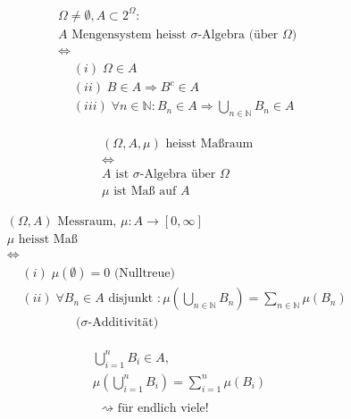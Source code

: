 \documentclass[a4paper]{article}
\begin{document}
{{		{
			\begin{gather*}
				\Omega \neq \emptyset,
				A
				\subset 2 ^{\Omega}: \\
				A \text{ Mengensystem heisst $\sigma$-Algebra (über $\Omega$) } \\
				\Leftrightarrow \\
				\begin{align*}
					&(i) \; \Omega \in A \\
					&(ii) \; B \in A \Rightarrow B ^{c} \in A \\
					&(iii) \; \forall n \in \mathbb{N}: B_n \in A
					\Rightarrow \bigcup_{n \in \mathbb{N}}  B_n \in A
				\end{align*}
			\end{gather*}
		}
		\newpage

		{
			\begin{gather*}
				(\Omega, A, \mu) \text{ heisst Maßraum } \\
				\Leftrightarrow \\
				A \text{ ist $\sigma$-Algebra über $\Omega$ } \\
				\mu \text{ ist Maß auf $A$ }
			\end{gather*}
		}
		\newpage

		{
			\begin{gather*}
				(\Omega, A) \text{ Messraum, }
				\mu: A \to [0, \infty] \\
				\mu \text{ heisst Maß } \\
				\Leftrightarrow \\
				\begin{align*}
					&(i) \; \mu (\emptyset) = 0 \text{ (Nulltreue) } \\
					&(ii) \; \forall B_n \in A \text{ disjunkt }:
					\mu \left(
						\bigcup_{n \in \mathbb{N}}  B_n
					\right) = \sum_{n \in \mathbb{N}} \mu (B_n) \\
					&\qquad \qquad \text{ ($\sigma$-Additivität) }
				\end{align*}
			\end{gather*}
		}
		\newpage

		{
			\begin{gather*}
				\bigcup_{i=1}^{n} B_i \in A,
				\\
				\mu \left(
					\bigcup_{i=1}^{n} B_i
				\right) = 
				\sum_{i=1}^{n} \mu (B_i)
				\\
				\\
				\text{ $\rightsquigarrow$ für endlich viele! }
			\end{gather*}
		}
		\newpage

}}
\end{document}
